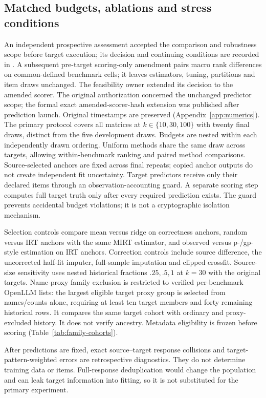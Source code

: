 \documentclass{article}
\begin{document}
\subsection{Matched budgets, ablations and stress conditions}
An independent prospective assessment accepted the comparison and robustness scope before target execution; its decision and continuing conditions are recorded in . A subsequent pre-target scoring-only amendment pairs macro rank differences on common-defined benchmark cells; it leaves estimators, tuning, partitions and item draws unchanged. The feasibility owner extended its decision to the amended scorer. The original authorization concerned the unchanged predictor scope; the formal exact amended-scorer-hash extension was published after prediction launch. Original timestamps are preserved (Appendix~\ref{app:numerics}). The primary protocol covers all matrices at $k\in\{10,30,100\}$ with twenty final draws, distinct from the five development draws. Budgets are nested within each independently drawn ordering. Uniform methods share the same draw across targets, allowing within-benchmark ranking and paired method comparisons. Source-selected anchors are fixed across final repeats; copied anchor outputs do not create independent fit uncertainty. Target predictors receive only their declared items through an observation-accounting guard. A separate scoring step computes full target truth only after every required prediction exists. The guard prevents accidental budget violations; it is not a cryptographic isolation mechanism.

Selection controls compare mean versus ridge on correctness anchors, random versus IRT anchors with the same MIRT estimator, and observed versus p-/gp-style estimation on IRT anchors. Correction controls include source difference, the uncorrected half-fit imputer, full-sample imputation and clipped crossfit. Source-size sensitivity uses nested historical fractions $.25,.5,1$ at $k=30$ with the original targets. Name-proxy family exclusion is restricted to verified per-benchmark OpenLLM lists: the largest eligible target proxy group is selected from names/counts alone, requiring at least ten target members and forty remaining historical rows. It compares the same target cohort with ordinary and proxy-excluded history. It does not verify ancestry. Metadata eligibility is frozen before scoring (Table~\ref{tab:family-cohorts}).

After predictions are fixed, exact source--target response collisions and target-pattern-weighted errors are retrospective diagnostics. They do not determine training data or items. Full-response deduplication would change the population and can leak target information into fitting, so it is not substituted for the primary experiment.
\end{document}

